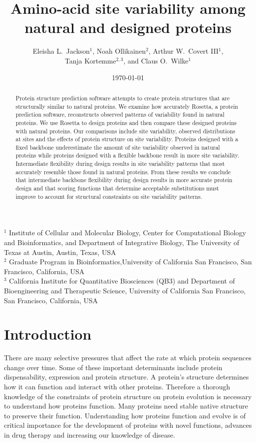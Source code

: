 \documentclass[12pt]{article}
\title{Amino-acid site variability among natural and designed proteins}
\author{Eleisha L.\ Jackson$^1$, Noah Ollikainen$^2$, Arthur W.\ Covert III$^1$,\\ Tanja Kortemme$^{2,3}$, and Claus O.\ Wilke$^1$}
\begin{document}
\date{\today}
\maketitle

\noindent
$^1$ Institute of Cellular and Molecular Biology, Center for Computational Biology and Bioinformatics, and Department of Integrative Biology, The University of Texas at Austin, Austin, Texas, USA\\
$^2$ Graduate Program in Bioinformatics,University of California San Francisco, San Francisco, California, USA\\
$^3$ California Institute for Quantitative Biosciences (QB3) and Department of Bioengineering and Therapeutic Science, University of California San Francisco, San Francisco, California, USA


\begin{abstract}
{\color{blue}
Protein structure prediction software attempts to create protein structures that are structurally similar to natural proteins. We examine how accurately Rosetta, a protein prediction software, reconstructs observed patterns of variability found in natural proteins. We use Rosetta to design proteins and then compare these designed proteins with natural proteins. Our comparisons include site variability, observed distributions at sites and the effects of protein structure on site variability. Proteins designed with a fixed backbone underestimate the amount of site variability observed in natural proteins while proteins designed with a flexible backbone result in more site variability. Intermediate flexibility during design results in site variability patterns that most accurately resemble those found in natural proteins. From these results we conclude that intermediate backbone flexibility during design results in more accurate protein design and that scoring functions that determine acceptable substitutions must improve to account for structural constraints on site variability patterns.
}
\end{abstract}


\section{Introduction}
\label{Introduction}

{\color{blue}
There are many selective pressures that affect the rate at which protein sequences change over time. Some of these important determinants include protein dispensability, expression and protein structure. A protein's structure determines how it can function and interact with other proteins.  Therefore a thorough knowledge of the constraints of protein structure on protein evolution is necessary to understand how proteins function. Many proteins need stable native structure to preserve their function. Understanding how proteins function and evolve is of critical importance for the development of proteins with novel functions, advances in drug therapy and increasing our knowledge of disease.  
}
\end{document}
